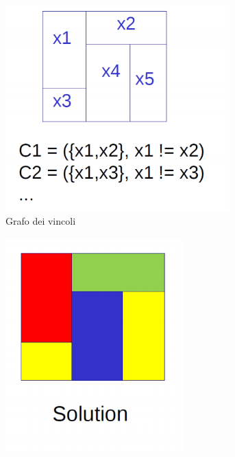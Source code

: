 \documentclass[11pt,oneside]{book}
\begin{document}
\begin{figure}[htp]
	\begin{subfigure}{0.49\textwidth}
	    \centering
		\includegraphics[width=0.95\textwidth]{map-col1.png} 
		\caption{Grafo dei vincoli}
	\end{subfigure}
	\hfill
	\begin{subfigure}{0.49\textwidth}
	    \centering
		\includegraphics[width=0.75\textwidth]{map-col2.png} 

\end{subfigure}
\end{figure}
\end{document}
